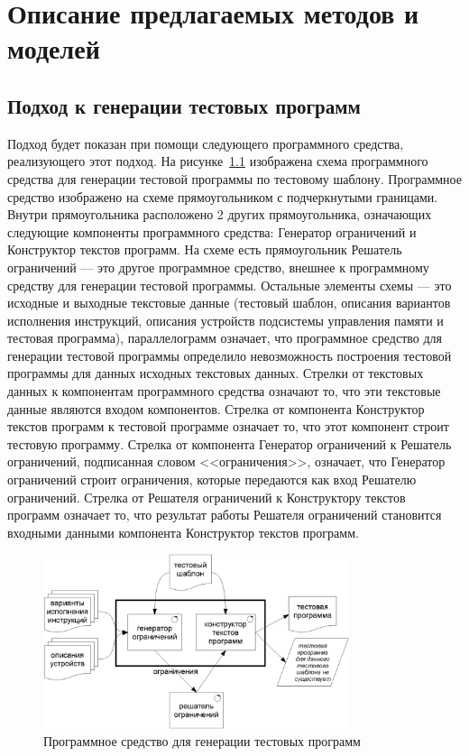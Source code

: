 
\newcommand{\cmpn}[1]{\textsf{#1}}

\chapter{Описание предлагаемых методов и моделей}

\section{Подход к генерации тестовых программ}\label{sec:approach}

Подход будет показан при помощи следующего программного средства, реализующего этот подход. На рисунке~\ref{fig:gen_scheme} изображена схема программного средства для генерации тестовой программы по тестовому шаблону. Программное средство изображено на схеме прямоугольником с подчеркнутыми границами. Внутри прямоугольника расположено 2 других прямоугольника, означающих следующие компоненты программного средства: \cmpn{Генератор ограничений} и \cmpn{Конструктор текстов программ}. На схеме есть прямоугольник \cmpn{Решатель ограничений} --- это другое программное средство, внешнее к программному средству для генерации тестовой программы. Остальные элементы схемы --- это исходные и выходные текстовые данные (тестовый шаблон, описания вариантов исполнения инструкций, описания устройств подсистемы управления памяти и тестовая программа), параллелограмм означает, что программное средство для генерации тестовой программы определило невозможность построения тестовой программы для данных исходных текстовых данных. Стрелки от текстовых данных к компонентам программного средства означают то, что эти текстовые данные являются входом компонентов. Стрелка от компонента \cmpn{Конструктор текстов программ} к тестовой программе означает то, что этот компонент строит тестовую программу. Стрелка от компонента \cmpn{Генератор ограничений} к \cmpn{Решатель ограничений}, подписанная словом <<ограничения>>, означает, что \cmpn{Генератор ограничений} строит ограничения, которые передаются как вход \cmpn{Решателю ограничений}. Стрелка от \cmpn{Решателя ограничений} к \cmpn{Конструктору текстов программ} означает то, что результат работы \cmpn{Решателя ограничений} становится входными данными компонента \cmpn{Конструктор текстов программ}.

\begin{figure}[h] \center
  \includegraphics[width=0.8\textwidth]{2.theor/scheme}
  \caption{Программное средство для генерации тестовых программ}\label{fig:gen_scheme}
\end{figure}

